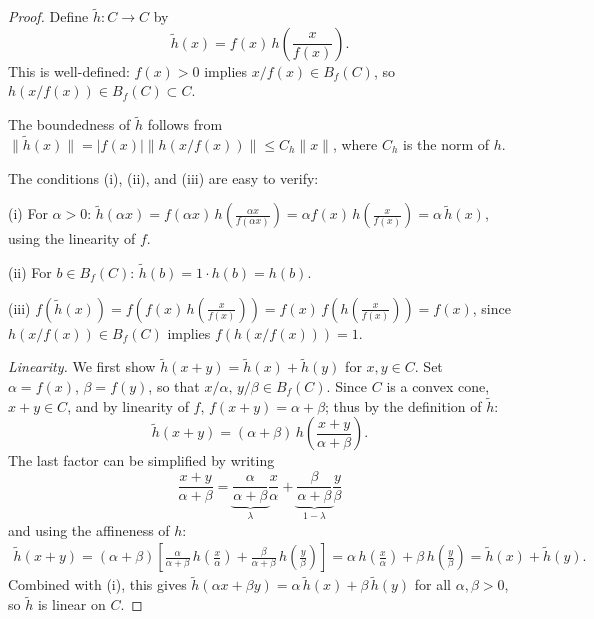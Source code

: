 \documentclass[
    11pt,
    letterpaper,
    reprint,
    notitlepage,
    superscriptaddress,
    aps,prx
]{revtex4-2}
\begin{document}
\begin{proof}
Define $\tilde h: C \to C$ by 
\begin{equation*}
	\tilde h(x) = f(x)\, h\!\left(\frac{x}{f(x)}\right).
\end{equation*}
This is well-defined: $f(x) > 0$ implies $x/f(x) \in B_f(C)$, so $h(x/f(x)) \in B_f(C) \subset C$.

\noindent The boundedness of $\tilde h$ follows from $\| \tilde h (x) \| = |f(x)| \| h(x/f(x))\| \leq C_h \| x\|$, where $C_h$ is the norm of $h$.

\noindent The conditions (i), (ii), and (iii) are easy to verify:

(i) For $\alpha > 0$: $\tilde h(\alpha x) = f(\alpha x)\, h\!\left(\frac{\alpha x}{f(\alpha x)}\right) = \alpha f(x)\, h\!\left(\frac{x}{f(x)}\right) = \alpha\, \tilde h(x)$,
using the linearity of $f$.

(ii) For $b \in B_f(C)$: $\tilde h(b) = 1 \cdot h(b) = h(b)$.

(iii) $f(\tilde h(x)) = f\!\left(f(x)\, h\!\left(\frac{x}{f(x)}\right)\right) = f(x)\, f\!\left(h\!\left(\frac{x}{f(x)}\right)\right) = f(x)$,
since $h(x/f(x)) \in B_f(C)$ implies $f(h(x/f(x))) = 1$.

\noindent \emph{Linearity.} We first show $\tilde h(x+y) = \tilde h(x) + \tilde h(y)$ for $x,y \in C$.
Set $\alpha = f(x)$, $\beta = f(y)$, so that $x/\alpha,\, y/\beta \in B_f(C)$.
Since $C$ is a convex cone, $x+y \in C$, and by linearity of $f$, $f(x+y) = \alpha + \beta$; thus 
by the definition of $\tilde h$:
\begin{equation*}
\tilde h(x+y) = (\alpha + \beta)\, h\!\left(\frac{x+y}{\alpha + \beta}\right).
\end{equation*}
The last factor can be simplified by writing
\begin{equation*}
	\frac{x+y}{\alpha + \beta} = \underbrace{\frac{\alpha}{\alpha+\beta}}_{\lambda}\frac{x}{\alpha} 
	+ \underbrace{\frac{\beta}{\alpha+\beta}}_{1-\lambda}\frac{y}{\beta}
\end{equation*}
and using the affineness of $h$:
\begin{equation*}
\begin{split}
	\tilde h(x+y) %
	= (\alpha+\beta)\left[\frac{\alpha}{\alpha+\beta}\, h\!\left(\frac{x}{\alpha}\right) 
	+ \frac{\beta}{\alpha+\beta}\, h\!\left(\frac{y}{\beta}\right)\right]
	= \alpha\, h\!\left(\frac{x}{\alpha}\right) + \beta\, h\!\left(\frac{y}{\beta}\right) 
	= \tilde h(x) + \tilde h(y).
\end{split}
\end{equation*}
Combined with (i), this gives $\tilde h(\alpha x + \beta y) = \alpha\,\tilde h(x) + \beta\,\tilde h(y)$ for all $\alpha,\beta > 0$, so $\tilde h$ is linear on $C$.


\end{proof}
\end{document}

